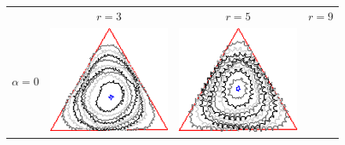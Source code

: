 \begin{figure}
\center
\begin{tabular}{p{2.5em}ccc}
& $r=3$ & $r=5$ & $r=9$ \\[2em]
\multirow{2}{*}{$\alpha=0$}& \includegraphics[scale=0.25]{figures/chapter6/radius-effect/triangle/improve/len_pen0/radius-3/summary.pdf} &
\includegraphics[scale=0.24]{figures/chapter6/radius-effect/triangle/improve/len_pen0/radius-5/summary.pdf} &

\end{tabular}
\end{figure}
